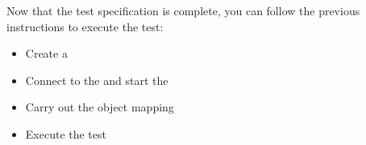 Now that the test specification is complete, you can follow the previous instructions to execute the test:
\begin{itemize}
\item Create a \gdsuite{} 
\item Connect to the \gdserver{} and start the \gdaut{} 
\item Carry out the object mapping 
\item Execute the test 
\end{itemize}
